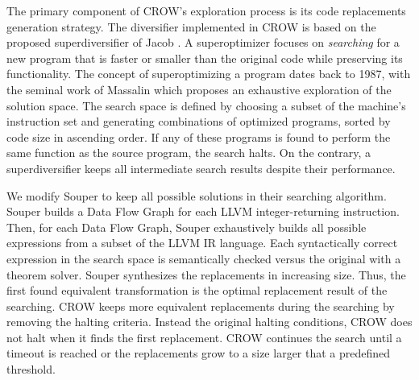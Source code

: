 

The primary component of CROW's exploration process is its code replacements generation strategy. The diversifier implemented in CROW is based on the proposed superdiversifier of Jacob \etal \cite{jacob2008superdiversifier}.
A superoptimizer focuses on \emph{searching} for a new program that is faster or smaller than the original code while preserving its functionality.
The concept of superoptimizing a program dates back to 1987, with the seminal work of Massalin \cite{Massalin1987} which proposes an exhaustive exploration of the solution space. The search space is defined by choosing a subset of the machine's instruction set and generating combinations of optimized programs, sorted by code size in ascending order. If any of these programs is found to perform the same function as the source program, the search halts. On the contrary, a superdiversifier keeps all intermediate search results despite their performance. 


We modify Souper \cite{Sasnauskas2017Souper:Superoptimizer} to keep all possible solutions in their searching algorithm.
Souper builds a Data Flow Graph for each LLVM integer-returning instruction. 
Then, for each Data Flow Graph, Souper exhaustively builds all possible expressions from a subset of the LLVM IR language.
Each syntactically correct expression in the search space is semantically checked versus the original with a theorem solver. Souper synthesizes the replacements in increasing size. Thus, the first found equivalent transformation is the optimal replacement result of the searching. 
CROW keeps more equivalent replacements during the searching by removing the halting criteria. Instead the original halting conditions, CROW does not halt when it finds the first replacement. CROW continues the search until a timeout is reached or the replacements grow to a size larger that a predefined threshold. 

